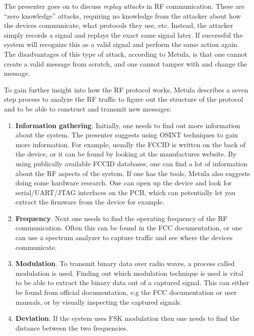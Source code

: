The presenter goes on to discuss \textit{replay attacks} in RF communication. These are \enquote{zero knowledge} attacks, requiring no knowledge from the attacker about how the devices communicate, what protocols they use, etc. Instead, the attacker simply records a signal and replays the exact same signal later. If successful the system will recognize this as a valid signal and perform the same action again. The disadvantages of this type of attack, according to Metula, is that one cannot create a valid message from scratch, and one cannot tamper with and change the message.

To gain further insight into how the RF protocol works, Metula describes a seven step process to analyze the RF traffic to figure out the structure of the protocol and to be able to construct and transmit new messages:
\begin{enumerate}
    \item \textbf{Information gathering}. Initially, one needs to find out more information about the system. The presenter suggests using \gls{OSINT} techniques to gain more information. For example, usually the FCCID is written on the back of the device, or it can be found by looking at the manufactures website. By using publically available FCCID databases, one can find a lot of information about the RF aspects of the system. If one has the tools, Metula also suggests doing some hardware research. One can open up the device and look for serial/UART/JTAG interfaces on the PCB, which can potentially let you extract the firmware from the device for example.
    
    \item \textbf{Frequency}. Next one needs to find the operating frequency of the RF communication. Often this can be found in the FCC documentation, or one can use a spectrum analyzer to capture traffic and see where the devices communicate.
    
    \item \textbf{Modulation}. To transmit binary data over radio waves, a process called modulation is used. Finding out which modulation technique is used is vital to be able to extract the binary data out of a captured signal. This can either be found from official documentation, e.g the FCC documentation or user manuals, or by visually inspecting the captured signals.
    
    \item \textbf{Deviation}. If the system uses \gls{FSK} modulation then one needs to find the distance between the two frequencies.
    

\end{enumerate}
